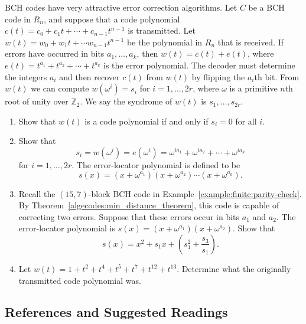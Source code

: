 {\small
BCH codes have very attractive error correction algorithms. Let $C$ be
a BCH code in $R_n$, and suppose that a code polynomial $c(t) = c_0 +
c_1 t + \cdots + c_{n-1} t^{n-1}$ is transmitted. Let $w(t) = w_0 +
w_1 t + \cdots w_{n-1} t^{n-1}$ be the polynomial in $R_n$ that is
received.  If errors have occurred in bits $a_1, \ldots, a_k$, then
$w(t) = c(t) + e(t)$, where $e(t) = t^{a_1} + t^{a_2} + \cdots +
t^{a_k}$ is the {\bfi error polynomial}. The
decoder must determine the integers $a_i$ and then recover $c(t)$ from
$w(t)$ by flipping the $a_i$th bit. From $w(t)$ we can compute
$w( \omega^i ) = s_i$ for $i = 1, \ldots, 2r$, where $\omega$ is a
primitive $n$th root of unity over ${\mathbb Z}_2$. We say the {\bfi
syndrome\/} of $w(t)$ is $s_1, \ldots,
s_{2r}$. 
\begin{enumerate}

\item
Show that $w(t)$ is a code polynomial if and only if $s_i = 0$ for all
$i$. 

\item
Show that 
\[
s_i = w( \omega^i) = e( \omega^i) = \omega^{i a_1} + \omega^{i a_2} +
\cdots + \omega^{i a_k} 
\]
for $i = 1, \ldots, 2r$. The {\bfi error-locator
polynomial\/} is defined to be 
\[
s(x) = (x + \omega^{a_1})(x + \omega^{a_2}) \cdots  (x +
\omega^{a_k}). 
\]

\item
Recall the $(15,7)$-block BCH code in Example~\ref{example:finite:parity-check}.  By Theorem~\ref{algecodes:min_distance_theorem}, this
code is capable of correcting two errors. Suppose that these errors
occur in bits $a_1$ and $a_2$. The error-locator polynomial
is $s(x) = (x + \omega^{a_1})(x + \omega^{a_2})$. Show that
\[
s(x) = x^2 + s_1 x + \left( s_1^2 + \frac{s_3}{s_1} \right).
\]


\item
Let $w(t) = 1 + t^2 +t^4 + t^5 + t^7 + t^{12} + t^{13}$. Determine
what the originally transmitted code polynomial was.

\end{enumerate}


}



\subsection*{References and Suggested Readings}
 


